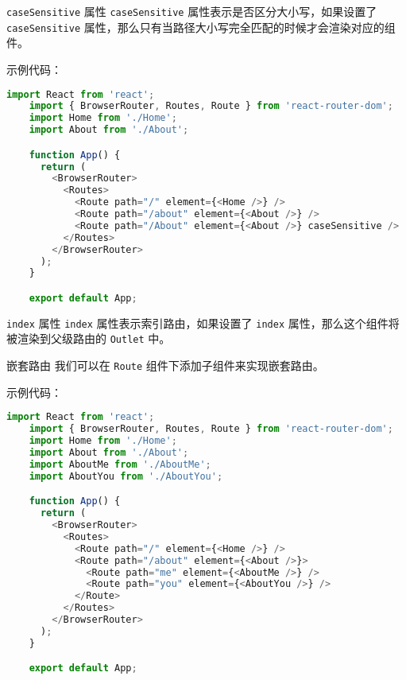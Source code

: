 \documentclass{beamer}
\begin{document}
\begin{frame}
  \framebreak

  \begin{block}{\texttt{caseSensitive} 属性}
    \texttt{caseSensitive} 属性表示是否区分大小写，如果设置了 \texttt{caseSensitive} 属性，那么只有当路径大小写完全匹配的时候才会渲染对应的组件。
  \end{block}

  示例代码：

  \begin{lstlisting}[language=JavaScript]
    import React from 'react';
    import { BrowserRouter, Routes, Route } from 'react-router-dom';
    import Home from './Home';
    import About from './About';

    function App() {
      return (
        <BrowserRouter>
          <Routes>
            <Route path="/" element={<Home />} />
            <Route path="/about" element={<About />} />
            <Route path="/About" element={<About />} caseSensitive />
          </Routes>
        </BrowserRouter>
      );
    }

    export default App;
  \end{lstlisting}

  \framebreak

  \begin{block}{\texttt{index} 属性}
    \texttt{index} 属性表示索引路由，如果设置了 \texttt{index} 属性，那么这个组件将被渲染到父级路由的 \texttt{Outlet} 中。
  \end{block}

  \begin{block}{嵌套路由}
    我们可以在 \texttt{Route} 组件下添加子组件来实现嵌套路由。
  \end{block}

  示例代码：

  \begin{lstlisting}[language=JavaScript]
    import React from 'react';
    import { BrowserRouter, Routes, Route } from 'react-router-dom';
    import Home from './Home';
    import About from './About';
    import AboutMe from './AboutMe';
    import AboutYou from './AboutYou';

    function App() {
      return (
        <BrowserRouter>
          <Routes>
            <Route path="/" element={<Home />} />
            <Route path="/about" element={<About />}>
              <Route path="me" element={<AboutMe />} />
              <Route path="you" element={<AboutYou />} />
            </Route>
          </Routes>
        </BrowserRouter>
      );
    }

    export default App;
  \end{lstlisting}

\end{frame}
\end{document}

